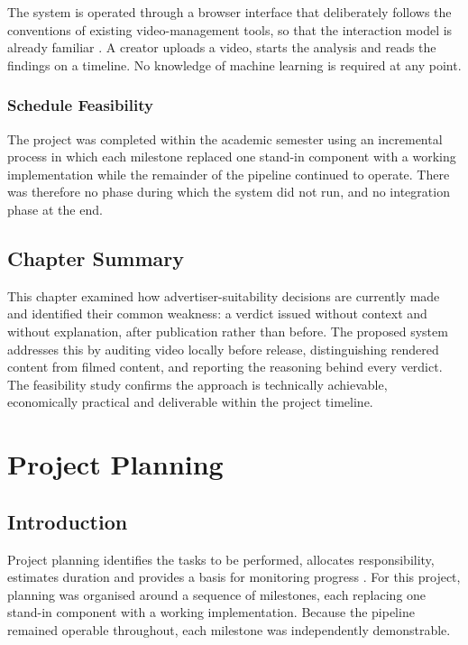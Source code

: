 \documentclass[
12pt,
a4paper,
oneside
]{report}
\begin{document}
The system is operated through a browser interface that deliberately follows the
conventions of existing video-management tools, so that the interaction model is
already familiar \cite{Nielsen2012}. A creator uploads a video, starts the
analysis and reads the findings on a timeline. No knowledge of machine learning
is required at any point.

\subsection{Schedule Feasibility}

The project was completed within the academic semester using an incremental
process in which each milestone replaced one stand-in component with a working
implementation while the remainder of the pipeline continued to operate. There
was therefore no phase during which the system did not run, and no integration
phase at the end.

\section{Chapter Summary}

This chapter examined how advertiser-suitability decisions are currently made
and identified their common weakness: a verdict issued without context and
without explanation, after publication rather than before. The proposed system
addresses this by auditing video locally before release, distinguishing rendered
content from filmed content, and reporting the reasoning behind every verdict.
The feasibility study confirms the approach is technically achievable,
economically practical and deliverable within the project timeline.

\chapter{Project Planning}


\section{Introduction}

Project planning identifies the tasks to be performed, allocates responsibility,
estimates duration and provides a basis for monitoring progress
\cite{Sommerville2016}. For this project, planning was organised around a
sequence of milestones, each replacing one stand-in component with a working
implementation. Because the pipeline remained operable throughout, each
milestone was independently demonstrable.
\end{document}

